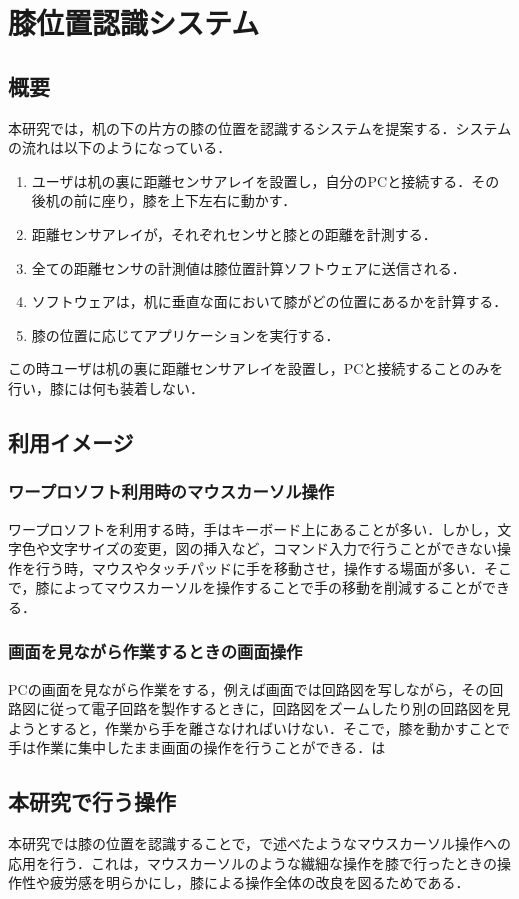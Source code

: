 \chapter{膝位置認識システム}
\section{概要}
本研究では，机の下の片方の膝の位置を認識するシステムを提案する．システムの流れは以下のようになっている．
\begin{enumerate}
	\item ユーザは机の裏に距離センサアレイを設置し，自分のPCと接続する．その後机の前に座り，膝を上下左右に動かす．
	\item 距離センサアレイが，それぞれセンサと膝との距離を計測する．
	\item 全ての距離センサの計測値は膝位置計算ソフトウェアに送信される．
	\item ソフトウェアは，机に垂直な面において膝がどの位置にあるかを計算する．
	\item 膝の位置に応じてアプリケーションを実行する．
\end{enumerate}
この時ユーザは机の裏に距離センサアレイを設置し，PCと接続することのみを行い，膝には何も装着しない．
\section{利用イメージ}
\subsection{ワープロソフト利用時のマウスカーソル操作}
ワープロソフトを利用する時，手はキーボード上にあることが多い．しかし，文字色や文字サイズの変更，図の挿入など，コマンド入力で行うことができない操作を行う時，マウスやタッチパッドに手を移動させ，操作する場面が多い．そこで，膝によってマウスカーソルを操作することで手の移動を削減することができる．
\subsection{画面を見ながら作業するときの画面操作}
PCの画面を見ながら作業をする，例えば画面では回路図を写しながら，その回路図に従って電子回路を製作するときに，回路図をズームしたり別の回路図を見ようとすると，作業から手を離さなければいけない．そこで，膝を動かすことで手は作業に集中したまま画面の操作を行うことができる．は
\section{本研究で行う操作}
本研究では膝の位置を認識することで，で述べたようなマウスカーソル操作への応用を行う．これは，マウスカーソルのような繊細な操作を膝で行ったときの操作性や疲労感を明らかにし，膝による操作全体の改良を図るためである．　



